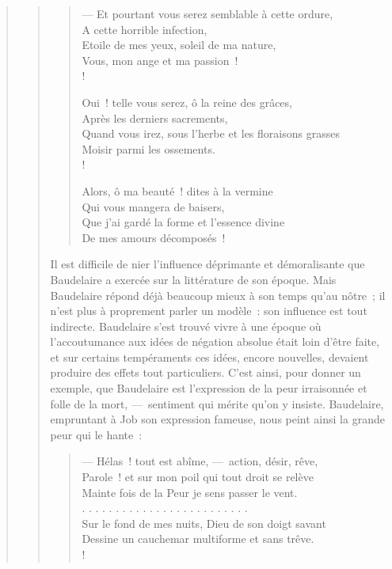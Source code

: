 \documentclass[french,twoside]{book} %
\begin{document}
\begin{verse}
\begin{verse}
\begin{verse}
— Et pourtant vous serez semblable à cette ordure,\\
A cette horrible infection,\\
Etoile de mes yeux, soleil de ma nature,\\
Vous, mon ange et ma passion !\\!

Oui ! telle vous serez, ô la reine des grâces,\\
Après les derniers sacrements,\\
Quand vous irez, sous l’herbe et les floraisons grasses\\
Moisir parmi les ossements.\\!

Alors, ô ma beauté ! dites à la vermine\\
Qui vous mangera de baisers,\\
Que j’ai gardé la forme et l’essence divine\\
De mes amours décomposés !\\
\end{verse}

\noindent Il est difficile de nier l’influence déprimante et démoralisante que Baudelaire a exercée sur la littérature de son époque. Mais Baudelaire répond déjà beaucoup mieux à son temps qu’au nôtre ; il n’est plus à proprement parler un modèle : son influence est tout indirecte. Baudelaire s’est trouvé vivre à une époque où l’accoutumance aux idées de négation absolue était loin d’être faite, et sur certains tempéraments ces idées, encore nouvelles, devaient produire des effets tout particuliers. C’est ainsi, pour donner un exemple, que Baudelaire est l’expression de la peur irraisonnée et folle de la mort, — sentiment qui mérite qu’on y insiste. Baudelaire, empruntant à Job son expression fameuse, nous peint ainsi la grande peur qui le hante :\par


\begin{verse}
— Hélas ! tout est abîme, — action, désir, rêve,\\
Parole ! et sur mon poil qui tout droit se relève\\
Mainte fois de la Peur je sens passer le vent.\\
. . . . . . . . . . . . . . . . . . . . . . . . .\\
Sur le fond de mes nuits, Dieu de son doigt savant\\
Dessine un cauchemar multiforme et sans trêve.\\!


\end{verse}
\end{verse}
\end{verse}
\end{document}

